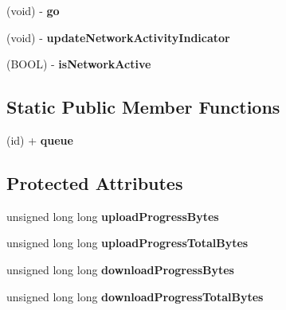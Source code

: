 \begin{DoxyCompactItemize}
\item 
\hypertarget{interface_a_s_i_network_queue_abeaa1ecbfc31ec7ae8082ff8394f7b9b}{
(void) -\/ {\bfseries go}}
\label{interface_a_s_i_network_queue_abeaa1ecbfc31ec7ae8082ff8394f7b9b}

\item 
\hypertarget{interface_a_s_i_network_queue_a78614c992056f2ab1941c94eb7106e0c}{
(void) -\/ {\bfseries updateNetworkActivityIndicator}}
\label{interface_a_s_i_network_queue_a78614c992056f2ab1941c94eb7106e0c}

\item 
\hypertarget{interface_a_s_i_network_queue_ab885ce42fa4f857f58923ae1c73fbbe6}{
(BOOL) -\/ {\bfseries isNetworkActive}}
\label{interface_a_s_i_network_queue_ab885ce42fa4f857f58923ae1c73fbbe6}

\end{DoxyCompactItemize}
\subsection*{Static Public Member Functions}
\begin{DoxyCompactItemize}
\item 
\hypertarget{interface_a_s_i_network_queue_af2b6cbcf9ce67a2480aeb8114a142941}{
(id) + {\bfseries queue}}
\label{interface_a_s_i_network_queue_af2b6cbcf9ce67a2480aeb8114a142941}

\end{DoxyCompactItemize}
\subsection*{Protected Attributes}
\begin{DoxyCompactItemize}
\item 
\hypertarget{interface_a_s_i_network_queue_ab89d216446e576ebdbd6c8bb643591bb}{
unsigned long long {\bfseries uploadProgressBytes}}
\label{interface_a_s_i_network_queue_ab89d216446e576ebdbd6c8bb643591bb}

\item 
\hypertarget{interface_a_s_i_network_queue_a1840db3b71aa30e07349658aedc4a48b}{
unsigned long long {\bfseries uploadProgressTotalBytes}}
\label{interface_a_s_i_network_queue_a1840db3b71aa30e07349658aedc4a48b}

\item 
\hypertarget{interface_a_s_i_network_queue_abc1b1bc4184f501837ffa33d9b4e7aee}{
unsigned long long {\bfseries downloadProgressBytes}}
\label{interface_a_s_i_network_queue_abc1b1bc4184f501837ffa33d9b4e7aee}

\item 
\hypertarget{interface_a_s_i_network_queue_acebbce37ed5ed1079b762f5d344a020f}{
unsigned long long {\bfseries downloadProgressTotalBytes}}
\label{interface_a_s_i_network_queue_acebbce37ed5ed1079b762f5d344a020f}

\end{DoxyCompactItemize}
